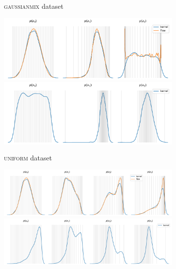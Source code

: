 \begin{figure}[!htb]
\begin{center}
\begin{subfigure}[b]{0.48\linewidth}
      \caption{\textsc{gaussianmix} dataset}
      \label{fig:NF_1D_GAUSSIANMIXTURE}
    \end{subfigure}
    \vspace{1em}
    \begin{subfigure}[b]{0.48\linewidth}
      \centering
      \includegraphics[width=\linewidth, trim=0 0 0 20, clip]{figures/1D/UNIFORM/plot_generative_flow_evolution.pdf}
      \includegraphics[width=\linewidth, trim=0 0 0 26, clip]{figures/1D/UNIFORM/plot_normalizing_flow_evolution.pdf}
      \caption{\textsc{uniform} dataset}
      \label{fig:NF_1D_UNIFORM}
    \end{subfigure}
    \hfill{\color{lightgray}\vrule}\hfill
    \begin{subfigure}[b]{0.48\linewidth}
      \centering
      \includegraphics[width=\linewidth, trim=0 0 0 20, clip]{figures/1D/POWER/plot_generative_flow_evolution.pdf}
      \includegraphics[width=\linewidth, trim=0 0 0 26, clip]{figures/1D/POWER/plot_normalizing_flow_evolution.pdf}

\end{subfigure}
\end{center}
\end{figure}
